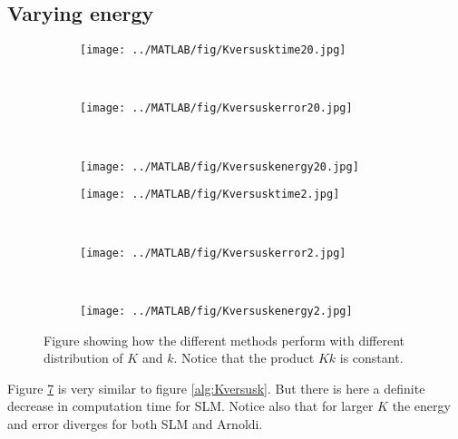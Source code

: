 \subsection{Varying energy}%
\begin{figure}[H]
        \centering
		\begin{subfigure}[b]{0.3\textwidth}
                \texttt{[image: ../MATLAB/fig/Kversusktime20.jpg]}
                \caption{  }
                \label{fig:Kversusktime20}
        \end{subfigure}
        ~
        \begin{subfigure}[b]{0.3\textwidth}
                \texttt{[image: ../MATLAB/fig/Kversuskerror20.jpg]}
                \caption{  }
                \label{fig:Kversuskerror20}
        \end{subfigure}
        ~
        \begin{subfigure}[b]{0.3\textwidth}
                \texttt{[image: ../MATLAB/fig/Kversuskenergy20.jpg]}
                \caption{  }
                \label{fig:Kversuskenergy20}
        \end{subfigure}        
        
        \begin{subfigure}[b]{0.3\textwidth}
                \texttt{[image: ../MATLAB/fig/Kversusktime2.jpg]}
                \caption{  }
                \label{fig:Kversusktime2}
        \end{subfigure}
        ~
        \begin{subfigure}[b]{0.3\textwidth}
                \texttt{[image: ../MATLAB/fig/Kversuskerror2.jpg]}
                \caption{  }
                \label{fig:Kversuskerror2}
        \end{subfigure}
        ~
        \begin{subfigure}[b]{0.3\textwidth}
                \texttt{[image: ../MATLAB/fig/Kversuskenergy2.jpg]}
                \caption{  }
                \label{fig:Kversuskenergy2}
        \end{subfigure}
        \caption{Figure showing how the different methods perform with different distribution of $K$ and $k$. Notice that the product $Kk$ is constant. }
        \label{fig:Kversusk2}
\end{figure}
Figure \ref{fig:Kversusk2} is very similar to figure \ref{alg:Kversusk}. But there is here a definite decrease in computation time for SLM. Notice also that for larger $K$ the energy and error diverges for both SLM and Arnoldi. 

